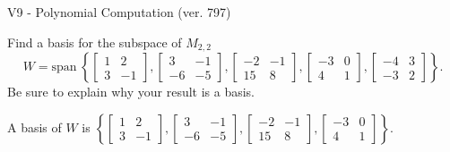 \begin{exercise}
  \begin{exerciseTitle}V9 - Polynomial Computation (ver. 797)\end{exerciseTitle}
  \begin{exerciseStatement}
    Find a basis for the subspace of \(M_{2,2}\) 
\[W=\mathrm{span}\ \left\{\left[\begin{array}{cc}
1 & 2 \\
3 & -1
\end{array}\right] , \left[\begin{array}{cc}
3 & -1 \\
-6 & -5
\end{array}\right] , \left[\begin{array}{cc}
-2 & -1 \\
15 & 8
\end{array}\right] , \left[\begin{array}{cc}
-3 & 0 \\
4 & 1
\end{array}\right] , \left[\begin{array}{cc}
-4 & 3 \\
-3 & 2
\end{array}\right]\right\}.\]
 Be sure to explain why your result is a basis.


  \end{exerciseStatement}
  \begin{exerciseAnswer}
   A basis of \(W\) is  \(\left\{\left[\begin{array}{cc}
1 & 2 \\
3 & -1
\end{array}\right] , \left[\begin{array}{cc}
3 & -1 \\
-6 & -5
\end{array}\right] , \left[\begin{array}{cc}
-2 & -1 \\
15 & 8
\end{array}\right] , \left[\begin{array}{cc}
-3 & 0 \\
4 & 1
\end{array}\right]\right\}\).
  


  \end{exerciseAnswer}
\end{exercise}